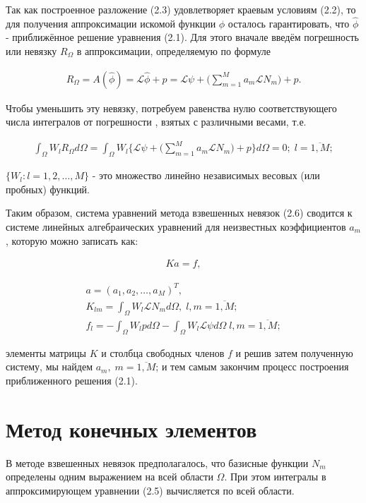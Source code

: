 \documentclass[14pt]{extreport}
\begin{document}
Так как построенное разложение (2.3) удовлетворяет краевым условиям (2.2), то для получения аппроксимации искомой функции $\phi$ осталось гарантировать, что $\hat\phi$ - приближённое решение уравнения (2.1). Для этого вначале введём погрешность или невязку $R_\Omega$ в аппроксимации, определяемую по формуле


\begin{eqnarray}
R_\Omega=A(\hat\phi)=\mathcal L \hat\phi+p=\mathcal L\psi+\bigg(\sum\limits_{m=1}^{M} a_m \mathcal L N_m\bigg) +p.
\end{eqnarray}

Чтобы уменьшить эту невязку, потребуем равенства нулю соответствующего числа интегралов от погрешности \cite{Zorich:2002:CALC}, взятых с различными весами, т.е.

\begin{eqnarray}
\int_\Omega W_l R_\Omega d\Omega = \int_\Omega W_l \bigg\{\mathcal L \psi +\bigg(\sum\limits_{m=1}^{M} a_m \mathcal L N_m\bigg) +p \bigg\} d\Omega =0; \; l=\overline{1,M};
\end{eqnarray}

 $\{W_l:l=1,2,\dots,M\}$ - это множество линейно независимых весовых (или пробных) функций.

Таким образом, система уравнений метода взвешенных невязок (2.6) сводится к системе линейных алгебраических уравнений для неизвестных коэффициентов $a_m$, которую можно записать как:

\begin{eqnarray}
Ka=f,
\end{eqnarray}


\begin{gather}
a = (a_1,a_2,\dots, a_M)^T, \\
K_{lm}=\int_\Omega W_l \mathcal L N_m  d\Omega, \; l,m=\overline{1,M}; \\
f_l=-\int_\Omega W_l p d \Omega-\int_\Omega W_l \mathcal L \psi d \Omega \; l,m=\overline{1,M};
\end{gather}


 элементы матрицы $K$ и столбца свободных членов $f$ и решив затем полученную систему, мы найдем $a_m,\; m=\overline{1,M}$; и тем самым закончим процесс построения приближенного решения (2.1).
\\

\section{Метод конечных элементов}
В методе взвешенных невязок предполагалось, что базисные функции $N_m$ определены одним выражением на всей области $\Omega$. При этом интегралы в аппроксимирующем уравнении (2.5) вычисляется по всей области.
\end{document}
